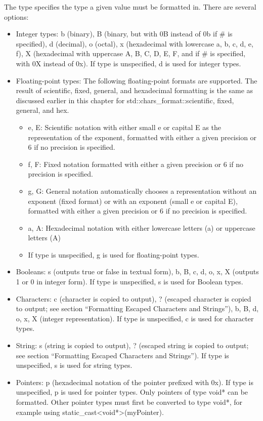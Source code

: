 The type specifies the type a given value must be formatted in. There are several options:

\begin{itemize}
\item
Integer types: b (binary), B (binary, but with 0B instead of 0b if \# is specified), d (decimal), o (octal), x (hexadecimal with lowercase a, b, c, d, e, f), X (hexadecimal with uppercase A, B, C, D, E, F, and if \# is specified, with 0X instead of 0x). If type is unspecified, d is used for integer types.

\item
Floating-point types: The following floating-point formats are supported. The result of scientific, fixed, general, and hexadecimal formatting is the same as discussed earlier in this chapter for std::chars\_format::scientific, fixed, general, and hex.

\begin{itemize}
\item
e, E: Scientific notation with either small e or capital E as the representation of the exponent, formatted with either a given precision or 6 if no precision is specified.

\item
f, F: Fixed notation formatted with either a given precision or 6 if no precision is specified.

\item
g, G: General notation automatically chooses a representation without an exponent (fixed format) or with an exponent (small e or capital E), formatted with either a given precision or 6 if no precision is specified.

\item
a, A: Hexadecimal notation with either lowercase letters (a) or uppercase letters (A)

\item
If type is unspecified, g is used for floating-point types.
\end{itemize}

\item
Booleans: s (outputs true or false in textual form), b, B, c, d, o, x, X (outputs 1 or 0 in integer form). If type is unspecified, s is used for Boolean types.

\item
Characters: c (character is copied to output), ? (escaped character is copied to output; see section “Formatting Escaped Characters and Strings”), b, B, d, o, x, X (integer representation). If type is unspecified, c is used for character types.

\item
String: s (string is copied to output), ? (escaped string is copied to output; see section “Formatting Escaped Characters and Strings”). If type is unspecified, s is used for string types.

\item
Pointers: p (hexadecimal notation of the pointer prefixed with 0x). If type is unspecified, p is used for pointer types. Only pointers of type void* can be formatted. Other pointer types must first be converted to type void*, for example using static\_cast<void*>(myPointer).
\end{itemize}

